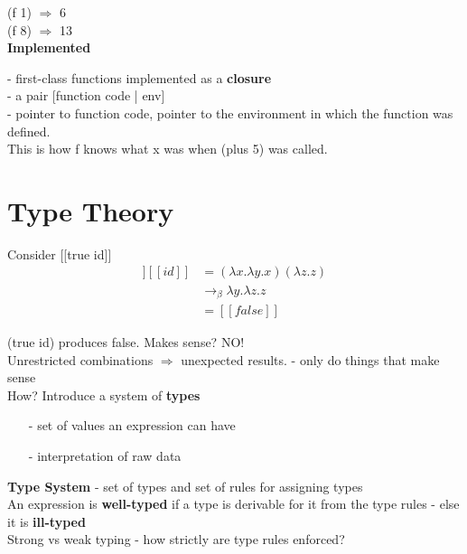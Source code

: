 \documentclass[11pt]{article}
\begin{document}
(f 1) $\Rightarrow$ 6 \\

(f 8) $\Rightarrow$ 13 \\

{\bf Implemented}

- first-class functions implemented as a {\bf closure} \\

- a pair [function code | env] \\

- pointer to function code, pointer to the environment in which the function was defined. \\

This is how f knows what x was when (plus 5) was called. \\

\pagebreak

\section{Type Theory} 

Consider [[true id]] 
\begin{align*}
[[true]][[id]] &= (\lambda x.\lambda y.x)(\lambda z.z) \\
&\rightarrow_\beta \lambda y.\lambda z.z \\
&= [[false]]
\end{align*}

(true id) produces false. Makes sense? NO! \\

Unrestricted combinations $\Rightarrow$ unexpected results. - only do things that make sense \\

How? Introduce a system of {\bf types}
\begin{itemize}
	\item[-] set of values an expression can have
	\item[-] interpretation of raw data
\end{itemize}

{\bf Type System} - set of types and set of rules for assigning types \\

An expression is {\bf well-typed} if a type is derivable for it from the type rules - else it is {\bf ill-typed} \\

Strong vs weak typing - how strictly are type rules enforced? \\
\end{document}

